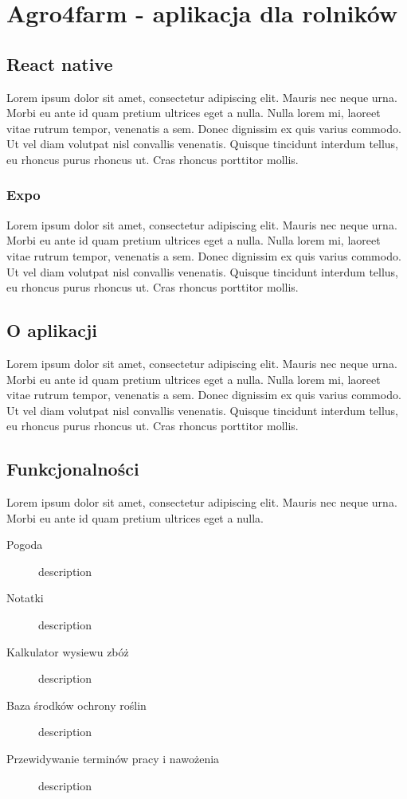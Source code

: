 \documentclass[a4paper,12pt,oneside]{book}
\begin{document}
	\newpage
	\chapter{Agro4farm - aplikacja dla rolników}
	
	\section{React native}
	Lorem ipsum dolor sit amet, consectetur adipiscing elit. Mauris nec neque urna. Morbi eu ante id quam pretium ultrices eget a nulla. Nulla lorem mi, laoreet vitae rutrum tempor, venenatis a sem. Donec dignissim ex quis varius commodo. Ut vel diam volutpat nisl convallis venenatis. Quisque tincidunt interdum tellus, eu rhoncus purus rhoncus ut. Cras rhoncus porttitor mollis.
	
	\subsection{Expo}
	Lorem ipsum dolor sit amet, consectetur adipiscing elit. Mauris nec neque urna. Morbi eu ante id quam pretium ultrices eget a nulla. Nulla lorem mi, laoreet vitae rutrum tempor, venenatis a sem. Donec dignissim ex quis varius commodo. Ut vel diam volutpat nisl convallis venenatis. Quisque tincidunt interdum tellus, eu rhoncus purus rhoncus ut. Cras rhoncus porttitor mollis.
	
	\section{O aplikacji}
	Lorem ipsum dolor sit amet, consectetur adipiscing elit. Mauris nec neque urna. Morbi eu ante id quam pretium ultrices eget a nulla. Nulla lorem mi, laoreet vitae rutrum tempor, venenatis a sem. Donec dignissim ex quis varius commodo. Ut vel diam volutpat nisl convallis venenatis. Quisque tincidunt interdum tellus, eu rhoncus purus rhoncus ut. Cras rhoncus porttitor mollis.
	
	\section{Funkcjonalności}
	Lorem ipsum dolor sit amet, consectetur adipiscing elit. Mauris nec neque urna. Morbi eu ante id quam pretium ultrices eget a nulla.
	\begin{description}
		\item[Pogoda] description
		\item[Notatki] description
		\item[Kalkulator wysiewu zbóż] description
		\item[Baza środków ochrony roślin] description
		\item[Przewidywanie terminów pracy i nawożenia] description
	\end{description}
	
\end{document}
